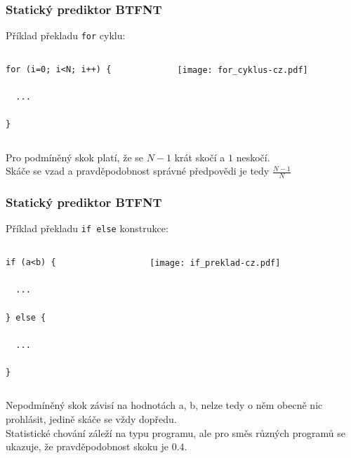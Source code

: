 \documentclass{beamer}
\begin{document}
\begin{frame}[fragile]
\frametitle{Statický prediktor BTFNT}

Příklad překladu \texttt{for} cyklu:

\begin{columns}[T]
\begin{column}{0.4\textwidth}
\begin{verbatim}
for (i=0; i<N; i++) {

  ...
  
}
\end{verbatim}
\end{column}
\begin{column}{0.6\textwidth}
\texttt{[image: for\_cyklus-cz.pdf]}
\end{column}
\end{columns}
\bigskip
Pro podmíněný skok platí, že se $N-1$ krát skočí a $1$ neskočí.\\
Skáče se vzad a pravděpodobnost správné předpovědi je tedy $\frac{N-1}{N}$

\end{frame}

\begin{frame}[fragile]
\frametitle{Statický prediktor BTFNT}

Příklad překladu \texttt{if else} konstrukce:

\begin{columns}[T]
\begin{column}{0.4\textwidth}
\begin{verbatim}
if (a<b) {
  
  ...

} else {

  ...

}
\end{verbatim}
\end{column}
\begin{column}{0.6\textwidth}
\texttt{[image: if\_preklad-cz.pdf]}
\end{column}
\end{columns}
\bigskip
Nepodmíněný skok závisí na hodnotách a, b, nelze tedy o něm obecně nic prohlásit, jedině skáče se vždy dopředu.\\
Statistické chování záleží na typu programu, ale pro směs různých programů se ukazuje, že pravděpodobnost skoku je $0.4$.

\end{frame}
\end{document}

